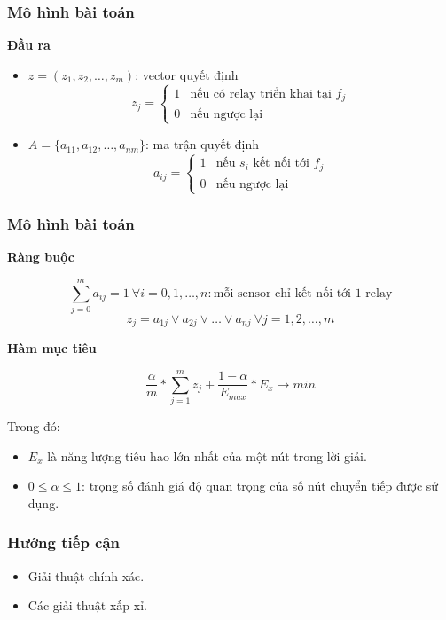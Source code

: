\begin{frame}
    \frametitle{Mô hình bài toán}
\textbf{Đầu ra }
\begin{itemize}
    \item $z = (z_1, z_2,…, z_m)$: vector quyết định
    \begin{equation}
        z_j = \begin{cases}
            1 & \textrm{nếu có relay triển khai tại $f_j$}\\
            0 & \textrm{nếu ngược lại}
        \end{cases}
    \end{equation}
    \item $A = \{a_{11}, a_{12},…, a_{nm}\}$: ma trận quyết định
    \begin{equation}
        a_{ij} = \begin{cases}
            1 & \textrm{nếu $s_i$ kết nối tới $f_j$}\\
            0 & \textrm{nếu ngược lại}
        \end{cases}
    \end{equation}
\end{itemize}

\end{frame}

\begin{frame}
    \frametitle{Mô hình bài toán}
\textbf{Ràng buộc }

\begin{equation}
    \sum_{j = 0}^m a_{ij} = 1 ~\forall i = 0, 1, \ldots, n: \textrm{mỗi sensor chỉ kết nối tới 1 relay}
\end{equation}
\begin{equation}
    z_j = a_{1j} \lor a_{2j} \lor \ldots \lor a_{nj} ~\forall j = 1, 2, \ldots, m
\end{equation}

\textbf{Hàm mục tiêu }

\begin{equation}
    \frac{\alpha}{m} * \sum_{j = 1}^m z_j + \frac{1 - \alpha}{E_{max}} * E_x \rightarrow min
    \label{obj_func}
\end{equation}

Trong đó:
\begin{itemize}
    \item $E_x$ là năng lượng tiêu  hao lớn nhất của một nút trong lời giải. 
    \item $0 \leq \alpha \leq 1$: trọng số đánh giá độ quan trọng của số nút chuyển tiếp được sử dụng.
\end{itemize}
    
\end{frame}

\begin{frame}
    \frametitle{Hướng tiếp cận}
    \begin{itemize}
        \item Giải thuật chính xác.
        \item Các giải thuật xấp xỉ.
    \end{itemize}
\end{frame}